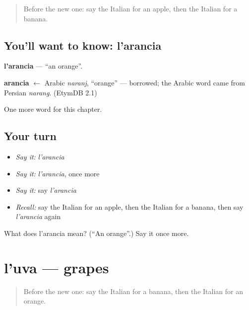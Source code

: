 \label{lesson:IT-C52-arancia}



\begin{quote}
Before the new one: say the Italian for an apple, then the Italian for a banana.
\end{quote}

\subsection*{You'll want to know: l'arancia}
\textbf{l'arancia} — \textquotedblleft{}an orange\textquotedblright{}.

\begin{cousinweb}
\textbf{arancia} $\leftarrow$ Arabic \emph{naranj}, \textquotedblleft{}orange\textquotedblright{} — borrowed; the Arabic word came from Persian \emph{narang}. (EtymDB 2.1)
\end{cousinweb}

\begin{grammarlens}[title={What you've built}]
One more word for this chapter.
\end{grammarlens}

\subsection*{Your turn}
\begin{itemize}
\raggedright
  \item \emph{Say it:} \emph{l'arancia}
  \item \emph{Say it:} \emph{l'arancia}, once more
  \item \emph{Say it:} say \emph{l'arancia}
  \item \emph{Recall:} say the Italian for an apple, then the Italian for a banana, then say \emph{l'arancia} again
\end{itemize}

\begin{tcolorbox}[breakable,colback=teal!4,colframe=teal!35!black,title={Before you move on}]
What does l'arancia mean? (\textquotedblleft{}An orange\textquotedblright{}.) Say it once more.
\end{tcolorbox}
\section[l'uva]{l'uva — grapes}

\label{lesson:IT-C52-uva}



\begin{quote}
Before the new one: say the Italian for a banana, then the Italian for an orange.
\end{quote}

